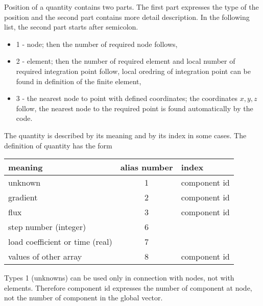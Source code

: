 Position of a quantity contains two parts. The first part expresses the type of the position and the
second part contains more detail description. In the following list, the second part starts after semicolon.
\begin{itemize}
\item[] 1 - node; then the number of required node follows,
\item[] 2 - element; then the number of required element and local number of required integration point follow,
local oredring of integration point can be found in definition of the finite element,
\item[] 3 - the nearest node to point with defined coordinates; the coordinates $x,y,z$ follow, the nearest
node to the required point is found automatically by the code.
\end{itemize}
 
The quantity is described by its meaning and by its index in some cases. The definition of quantity has the form

\begin{center}
\begin{tabular}{|l|c|l|}
\hline
meaning & alias number & index
\\ \hline \hline
unknown & 1 & component id
\\ \hline
gradient & 2 & component id
\\ \hline
flux & 3 & component id
\\ \hline
step number (integer) & 6 &
\\ \hline
load coefficient or time (real) & 7 &
\\ \hline
values of other array & 8 & component id
\\ \hline
\end{tabular}
\end{center}
Types 1 (unknowns) can be used only in connection with nodes, not
with elements. Therefore component id expresses the number of component at node, not the number of
component in the global vector.

